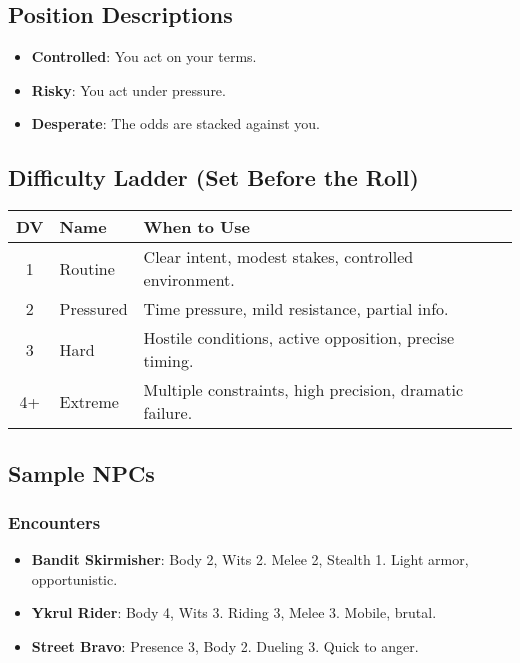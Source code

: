 \subsection*{Position Descriptions}

\begin{itemize}
    \item \textbf{Controlled}: You act on your terms.
    \item \textbf{Risky}: You act under pressure.
    \item \textbf{Desperate}: The odds are stacked against you.
\end{itemize}

\subsection*{Difficulty Ladder (Set Before the Roll)}

\begin{center}
\begin{tabular}{cll}
\toprule
\textbf{DV} & \textbf{Name} & \textbf{When to Use} \\
\midrule
1 & Routine & Clear intent, modest stakes, controlled environment. \\
2 & Pressured & Time pressure, mild resistance, partial info. \\
3 & Hard & Hostile conditions, active opposition, precise timing. \\
4+ & Extreme & Multiple constraints, high precision, dramatic failure. \\
\bottomrule
\end{tabular}
\end{center}

\subsection*{Sample NPCs}

\subsubsection*{Encounters}

\begin{itemize}
    \item \textbf{Bandit Skirmisher}: Body 2, Wits 2. Melee 2, Stealth 1. Light armor, opportunistic.
    \item \textbf{Ykrul Rider}: Body 4, Wits 3. Riding 3, Melee 3. Mobile, brutal.
    \item \textbf{Street Bravo}: Presence 3, Body 2. Dueling 3. Quick to anger.
\end{itemize}

